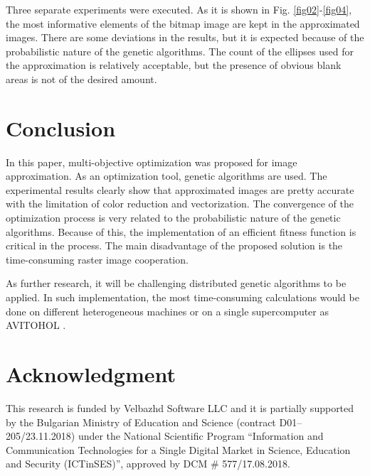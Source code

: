 \documentclass[conference]{IEEEtran}
\begin{document}
Three separate experiments were executed. As it is shown in Fig. \ref{fig02}-\ref{fig04}, the most informative elements of the bitmap image are kept in the approximated images. There are some deviations in the results, but it is expected because of the probabilistic nature of the genetic algorithms. The count of the ellipses used for the approximation is relatively acceptable, but the presence of obvious blank areas is not of the desired amount. 

\section{Conclusion}

In this paper, multi-objective optimization was proposed for image approximation. As an optimization tool, genetic algorithms are used. The experimental results clearly show that approximated images are pretty accurate with the limitation of color reduction and vectorization. The convergence of the optimization process is very related to the probabilistic nature of the genetic algorithms. Because of this, the implementation of an efficient fitness function is critical in the process. The main disadvantage of the proposed solution is the time-consuming raster image cooperation. 

As further research, it will be challenging distributed genetic algorithms to be applied. In such implementation, the most time-consuming calculations would be done on different heterogeneous machines or on a single supercomputer as AVITOHOL \cite{Tashev-Tasheva-Petrov-2019}. 

\section*{Acknowledgment}

This research is funded by Velbazhd Software LLC and it is partially supported by the Bulgarian Ministry of Education and Science (contract D01–205/23.11.2018) under the National Scientific Program ``Information and Communication Technologies for a Single Digital Market in Science, Education and Security (ICTinSES)'', approved by DCM \# 577/17.08.2018.
\end{document}

